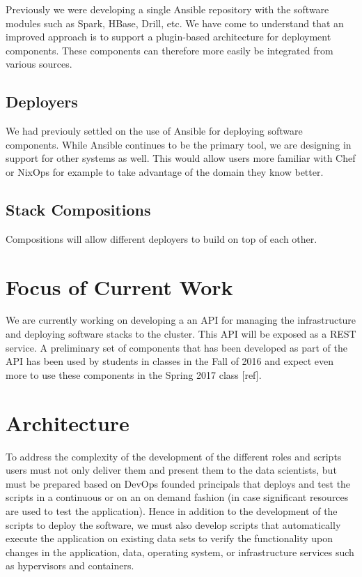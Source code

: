 \documentclass[9pt,twocolumn,twoside]{styles/osajnl}
\begin{document}
Previously we were developing a single Ansible repository with the software modules such as Spark, HBase, Drill, etc. We have come to understand that an improved approach is to support a plugin-based architecture for deployment components. These components can therefore more easily be integrated from various sources.


\subsection{Deployers}

We had previouly settled on the use of Ansible for deploying software components. While Ansible continues to be the primary tool, we are designing in support for other systems as well. This would allow users more familiar with Chef or NixOps for example to take advantage of the domain they know better.



\subsection{Stack Compositions}

Compositions will allow different deployers to build on top of each other.




\section{Focus of Current Work}

We are currently working on developing a an API for managing the infrastructure and deploying software stacks to the cluster. This API will be exposed as a REST service. A preliminary set of components that has been developed as part of the API has been used by students in classes in the Fall of 2016 and expect even more to use these components in the Spring 2017 class [ref].
\section{Architecture}

To address the complexity of the development of the different roles and scripts users must not only deliver them and present them to the data scientists, but must be prepared based on DevOps founded principals that deploys and test the scripts in a continuous or on an on demand fashion (in case significant resources are used to test the application). Hence in addition to the development of the scripts to deploy the software, we must also develop scripts that automatically execute the application on existing data sets to verify the functionality upon changes in the application, data, operating system, or infrastructure services such as hypervisors and containers.
\end{document}
